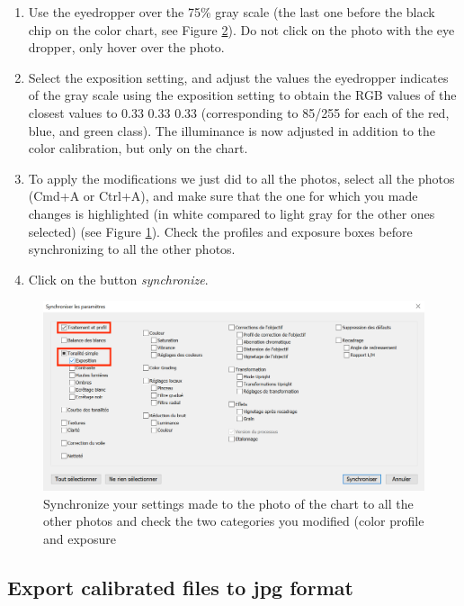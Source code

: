 \documentclass[
]{book}
\begin{document}
\begin{enumerate}
\def\labelenumi{\arabic{enumi}.}
\setcounter{enumi}{4}
\item
  Use the eyedropper over the 75\% gray scale (the last one before the
  black chip on the color chart, see Figure
  \protect\hyperlink{fig:xrite_description}{2}). Do not click on the photo with
  the eye dropper, only hover over the photo.
\item
  Select the exposition setting, and adjust the values the eyedropper
  indicates of the gray scale using the exposition setting to obtain
  the RGB values of the closest values to 0.33 0.33 0.33
  (corresponding to 85/255 for each of the red, blue, and green
  class). The illuminance is now adjusted in addition to the color
  calibration, but only on the chart.
\item
  To apply the modifications we just did to all the photos, select all the photos (Cmd+A or Ctrl+A), and make sure that the one for which you made changes is highlighted (in white compared to light gray for the other ones selected) (see Figure \ref{fig:synchronize}). Check the profiles and exposure boxes before synchronizing to all the other photos.
\item
  Click on the button \emph{synchronize}.
\end{enumerate}

\begin{figure}

{\centering \includegraphics[width=0.8\linewidth]{Figures/synchronize_capture} 

}

\caption{Synchronize your settings made to the photo of the chart to all the other photos and check the two categories you modified (color profile and exposure}\label{fig:synchronize}
\end{figure}

\hypertarget{export-calibrated-files-to-jpg-format}{%
\subsection{Export calibrated files to jpg format}\label{export-calibrated-files-to-jpg-format}}
\end{document}
